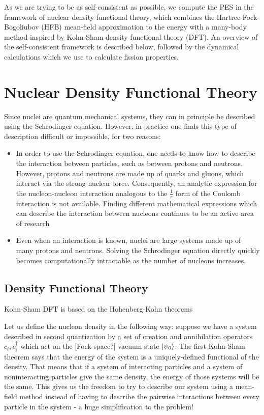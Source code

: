 As we are trying to be as self-consistent as possible, we compute the PES in the framework of nuclear density functional theory, which combines the Hartree-Fock-Bogoliubov (HFB) mean-field approximation to the energy with a many-body method inspired by Kohn-Sham density functional theory (DFT). An overview of the self-consistent framework is described below, followed by the dynamical calculations which we use to calculate fission properties.

\section{Nuclear Density Functional Theory}
Since nuclei are quantum mechanical systems, they can in principle be described using the Schrodinger equation. However, in practice one finds this type of description difficult or impossible, for two reasons:

\begin{itemize}
\item In order to use the Schrodinger equation, one needs to know how to describe the interaction between particles, such as between protons and neutrons. However, protons and neutrons are made up of quarks and gluons, which interact via the strong nuclear force. Consequently, an analytic expression for the nucleon-nucleon interaction analogous to the $\frac{1}{r}$ form of the Coulomb interaction is not available. Finding different mathematical expressions which can describe the interaction between nucleons continues to be an active area of research \cite{lots of papers}
\item Even when an interaction is known, nuclei are large systems made up of many protons and neutrons. Solving the Schrodinger equation directly quickly becomes computationally intractable as the number of nucleons increases.
\end{itemize}

\subsection{Density Functional Theory}\label{sect:DFT}
Kohn-Sham DFT is based on the Hohenberg-Kohn theorems

Let us define the nucleon density in the following way: suppose we have a system described in second quantization by a set of creation and annihilation operators $c_i, c_i^\dagger$ which act on the [Fock-space?] vacuum state $\ket{\psi_0}$. The first Kohn-Sham theorem says that the energy of the system is a uniquely-defined functional of the density. That means that if a system of interacting particles and a system of noninteracting particles give the same density, the energy of those systems will be the same. This gives us the freedom to try to describe our system using a mean-field method instead of having to describe the pairwise interactions between every particle in the system - a huge simplification to the problem!


